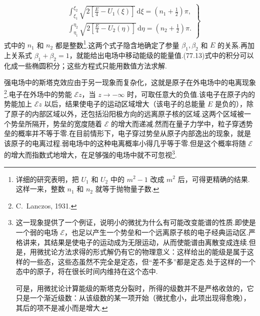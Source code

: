 \begin{equation}
\left.\begin{aligned}
  &\int_{\xi_1}^{\xi_2}\sqrt{2\left[\frac{E}{4}-U_1(\xi)\right]}\,\mathrm{d}\xi
  =\left(n_1+\frac{1}{2}\right)\pi,\\
  &\int_{\eta_1}^{\eta_2}\sqrt{2\left[\frac{E}{4}-U_2(\eta)\right]}\,\mathrm{d}\eta
  =\left(n_2+\frac{1}{2}\right)\pi.
\end{aligned}\right\}
\end{equation}
式中的 $n_1$ 和 $n_2$ 都是整数\footnote{详细的研究表明，把 $U_1$ 和 $U_2$ 中的 $m^{2}-1$ 改成 $m^{2}$ 后，可得更精确的结果.这样一来，整数 $n_1$ 和 $n_2$ 就等于抛物量子数.}.这两个式子隐含地确定了参量 $\beta_1,\beta_2$ 和 $E$ 的关系.再加上关系式 $\beta_1+\beta_2=1$，就能给出电场中移动能级的能量值.(77.13)式中的积分可以化成一些椭圆积分；这些方程式只能用数值方法求解.

强电场中的斯塔克效应由于另一现象而复杂化，这就是原子在外电场中的电离现象\footnote{C.~Lanczos, 1931.}.电子在外场中的势能 $\mathcal{E}z$，当 $z\rightarrow-\infty$ 时，可取任意大的负值.该电子在原子内的势能加上 $\mathcal{E}z$ 以后，结果使电子的运动区域增大（该电子的总能量 $E$ 是负的），除了原子的内部区域以外，还包括沿阳极方向的远离原子核的区域.这两个区域被一个势垒所隔开，势垒的宽度随着 $\mathcal{E}$ 的增大而递减.然而在量子力学中，粒子穿透势垒的概率并不等于零.在目前情形下，电子穿过势垒从原子内部逸出的现象，就是该原子的电离过程.弱电场中的这种电离概率小得几乎等于零.但是这个概率将随 $\mathcal{E}$ 的增大而指数式地增大，在足够强的电场中就不可忽视\footnote{这一现象提供了一个例证，说明小的微扰为什么有可能改变能谱的性质.即使是一个弱的电场 $\mathcal{E}$，也足以产生一个势垒和一个远离原子核的电子经典运动区.严格讲来，其结果是使电子的运动成为无限运动，从而使能谱由离散变成连续.但是，用微扰论方法求得的形式解仍有它的物理意义：这样给出的能级是属于这样的一些态，这些态虽然不完全是定态，但“差不多”都是定态.处于这样的一个态中的原子，将在很长时间内维持在这个态中.

可是，用微扰论计算能级的斯塔克分裂时，所得的级数并不是严格收敛的，它只是一个渐近级数：从该级数的某一项开始（微扰愈小，此项出现得愈晚），其后的项不是减小而是增大.}.

